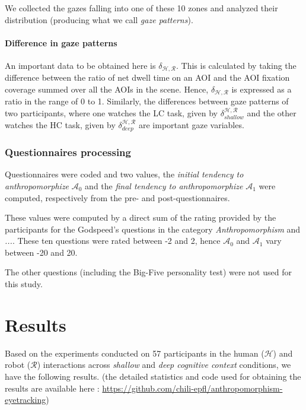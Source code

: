 \documentclass[lettersize, noapacite, twoside, HRI]{apa_HRI}
\newcommand{\anti}{{$\mathcal{A}_0$ }}
\newcommand{\antf}{{$\mathcal{A}_1$ }}
\begin{document}
We collected the gazes falling into one of these 10 zones and analyzed
their distribution (producing what we call \emph{gaze patterns}).

\paragraph{Difference in gaze patterns}

An important data to be obtained here is $\delta_{\mathcal{H},\mathcal{R}}$. This is calculated by
taking the difference between the ratio of net dwell time on an AOI and the AOI
fixation coverage summed over all the AOIs in the scene. Hence,
$\delta_{\mathcal{H},\mathcal{R}}$ is expressed as a ratio in the range of 0 to
1. Similarly, the differences between gaze patterns of two participants, where
one watches the LC task, given by $\delta_{shallow}^{\mathcal{H},\mathcal{R}}$ and
the other watches the HC task, given by
$\delta_{deep}^{\mathcal{H},\mathcal{R}}$ are important gaze variables.

\subsubsection{Questionnaires processing}


Questionnaires were coded and two values, the \emph{initial tendency to
anthropomorphize} \anti and the \emph{final tendency to anthropomorphize} \antf
were computed, respectively from the pre- and post-questionnaires.

These values were computed by a direct sum of the rating provided by the
participants for the Godspeed's questions in the category
\emph{Anthropomorphism} and \emph{...}. These ten questions were
rated between -2 and 2, hence \anti and \antf vary between -20 and 20.

The other questions (including the Big-Five personality test) were not used for
this study.

\section{Results}

Based on the experiments conducted on 57 participants in the human
($\mathcal{H}$) and robot ($\mathcal{R}$) interactions across \emph{shallow} and
\emph{deep cognitive context} conditions, we have the following results. (the
detailed statistics and code used for obtaining the results are available here :
\url{https://github.com/chili-epfl/anthropomorphism-eyetracking})
\end{document}
